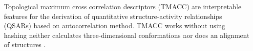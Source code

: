 Topological maximum cross correlation descriptors (TMACC) are interpretable features for the derivation of quantitative structure-activity relationships (QSARs) based on autocorrelation method. TMACC works without using hashing neither calculates three-dimensional conformations nor does an alignment of structures \cite{Melville_2007}.